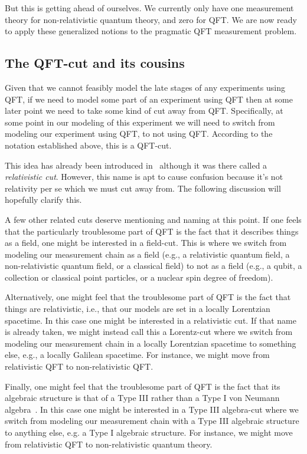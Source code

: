 \documentclass[12pt,prd,superscriptaddress,floatfix,amsmath,amssymb,amsfonts,nofootinbib]{revtex4-2}
\begin{document}
But this is getting ahead of ourselves. We currently only have one measurement theory for non-relativistic quantum theory, and zero for QFT. We are now ready to apply these generalized notions to the pragmatic QFT measurement problem.

\subsection{The QFT-cut and its cousins}
Given that we cannot feasibly model the late stages of any experiments using QFT, if we need to model some part of an experiment using QFT then at some later point we need to take some kind of cut away from QFT. Specifically, at some point in our modeling of this experiment we will need to switch from modeling our experiment using QFT, to not using QFT. According to the notation established above, this is a QFT-cut. 

This idea has already been introduced in~\cite{TaleOfTwo} although it was there called a \textit{relativistic cut}. However, this name is apt to cause confusion because it's not relativity per se which we must cut away from. The following discussion will hopefully clarify this.

A few other related cuts deserve mentioning and naming at this point. If one feels that the particularly troublesome part of QFT is the fact that it describes things as a field, one might be interested in a field-cut. This is where we switch from modeling our measurement chain as a field (e.g., a relativistic quantum field, a non-relativistic quantum field, or a classical field) to not as a field (e.g., a qubit, a collection or classical point particles, or a nuclear spin degree of freedom).

Alternatively, one might feel that the troublesome part of QFT is the fact that things are relativistic, i.e., that our models are set in a locally Lorentzian spacetime. In this case one might be interested in a relativistic cut. If that name is already taken, we might instead call this a Lorentz-cut where we switch from modeling our measurement chain in a locally Lorentzian spacetime to something else, e.g., a locally Galilean spacetime. For instance, we might move from relativistic QFT to non-relativistic QFT.

Finally, one might feel that the troublesome part of QFT is the fact that its algebraic structure is that of a Type III rather than a Type I von Neumann algebra~\cite{Witten,sep-qt-nvd}. In this case one might be interested in a Type III algebra-cut where we switch from modeling our measurement chain with a Type III algebraic structure to anything else, e.g. a Type I algebraic structure. For instance, we might move from relativistic QFT to non-relativistic quantum theory.
\end{document}
